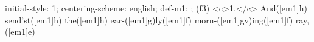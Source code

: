 initial-style: 1;
centering-scheme: english;
def-m1: \grealign;
(f3) <c>1.</c> And([em1]h) send'st([em1]h) the([em1]h) ear-([em1]g)ly([em1]f) morn-([em1]gv)ing([em1]f) ray,([em1]e)